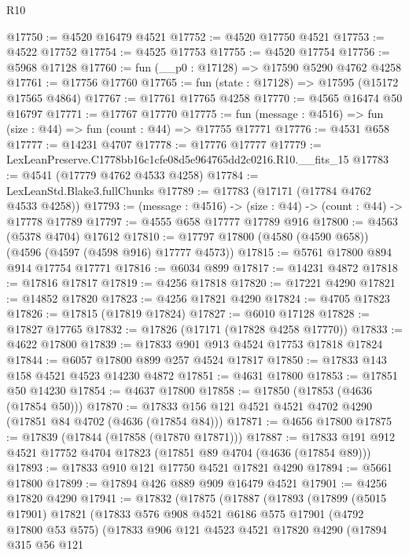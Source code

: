 \begin{lexlean}{R10}
\begin{coremodule}
@17750 := @4520 @16479 @4521
@17752 := @4520 @17750 @4521
@17753 := @4522 @17752
@17754 := @4525 @17753
@17755 := @4520 @17754
@17756 := @5968 @17128
@17760 := fun (__p0 : @17128) => @17590 @5290 @4762 @4258
@17761 := @17756 @17760
@17765 := fun (state : @17128) => @17595 (@15172 @17565 @4864)
@17767 := @17761 @17765 @4258
@17770 := @4565 @16474 @50 @16797
@17771 := @17767 @17770
@17775 := fun (message : @4516) => fun (size : @44) => fun (count : @44) => @17755 @17771
@17776 := @4531 @658
@17777 := @14231 @4707
@17778 := @17776 @17777
@17779 := LexLeanPreserve.C1778bb16c1cfe08d5e964765dd2c0216.R10.__fits_15
@17783 := @4541 (@17779 @4762 @4533 @4258)
@17784 := LexLeanStd.Blake3.fullChunks
@17789 := @17783 (@17171 (@17784 @4762 @4533 @4258))
@17793 := (message : @4516) -> (size : @44) -> (count : @44) -> @17778 @17789
@17797 := @4555 @658 @17777 @17789 @916
@17800 := @4563 (@5378 @4704) @17612
@17810 := @17797 @17800 (@4580 (@4590 @658)) (@4596 (@4597 (@4598 @916) @17777 @4573))
@17815 := @5761 @17800 @894 @914 @17754 @17771
@17816 := @6034 @899
@17817 := @14231 @4872
@17818 := @17816 @17817
@17819 := @4256 @17818
@17820 := @17221 @4290
@17821 := @14852 @17820
@17823 := @4256 @17821 @4290
@17824 := @4705 @17823
@17826 := @17815 (@17819 @17824)
@17827 := @6010 @17128
@17828 := @17827 @17765
@17832 := @17826 (@17171 (@17828 @4258 @17770))
@17833 := @4622 @17800
@17839 := @17833 @901 @913 @4524 @17753 @17818 @17824
@17844 := @6057 @17800 @899 @257 @4524 @17817
@17850 := @17833 @143 @158 @4521 @4523 @14230 @4872
@17851 := @4631 @17800
@17853 := @17851 @50 @14230
@17854 := @4637 @17800
@17858 := @17850 (@17853 (@4636 (@17854 @50)))
@17870 := @17833 @156 @121 @4521 @4521 @4702 @4290 (@17851 @84 @4702 (@4636 (@17854 @84)))
@17871 := @4656 @17800
@17875 := @17839 (@17844 (@17858 (@17870 @17871)))
@17887 := @17833 @191 @912 @4521 @17752 @4704 @17823 (@17851 @89 @4704 (@4636 (@17854 @89)))
@17893 := @17833 @910 @121 @17750 @4521 @17821 @4290
@17894 := @5661 @17800
@17899 := @17894 @426 @889 @909 @16479 @4521
@17901 := @4256 @17820 @4290
@17941 := @17832
    (@17875
      (@17887
        (@17893
          (@17899
            (@5015 @17901)
            @17821
            (@17833
              @576
              @908
              @4521
              @6186
              @575
              @17901
              (@4792 @17800 @53 @575)
              (@17833
                @906
                @121
                @4523
                @4521
                @17820
                @4290
                (@17894
                  @315
                  @56
                  @121

\end{coremodule}
\end{lexlean}
